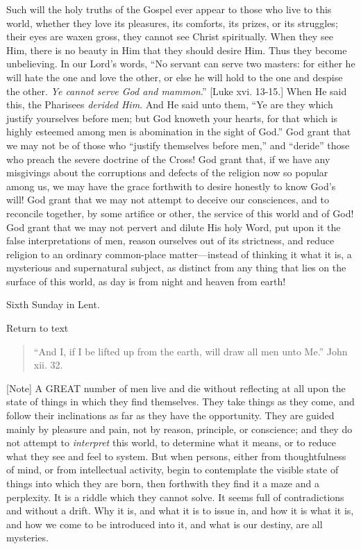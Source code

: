 Such will the holy truths of the Gospel ever appear to those who live
to this world, whether they love its pleasures, its comforts, its
prizes, or its struggles; their eyes are waxen gross, they cannot see
Christ spiritually. When they see Him, there is no beauty in Him that
they should desire Him. Thus they become unbelieving. In our Lord's
words, ``No servant can serve two masters: for either he will hate
the one and love the other, or else he will hold to the one and despise
the other. \emph{Ye cannot serve God and mammon}.'' [Luke xvi.
13-15.] When He said this, the Pharisees \emph{derided Him}. And He said
unto them, ``Ye are they which justify yourselves before men; but
God knoweth your hearts, for that which is highly esteemed among men is
abomination in the sight of God.'' God grant that we may not be of
those who ``justify themselves before men,'' and
``deride'' those who preach the severe doctrine of the Cross!
God grant that, if we have any misgivings about the corruptions and
defects of the religion now so popular among us, we may have the grace
forthwith to desire honestly to know God's will! God grant that we may
not attempt to deceive our consciences, and to reconcile together, by
some artifice or other, the service of this world and of God! God grant
that we may not pervert and dilute His holy Word, put upon it the false
interpretations of men, reason ourselves out of its strictness, and
reduce religion to an ordinary common-place matter—instead of thinking
it what it is, a mysterious and supernatural subject, as distinct from
any thing that lies on the surface of this world, as day is from night
and heaven from earth!


Sixth Sunday in Lent.

Return to text


\begin{quote}

``And I, if I be lifted up from the earth,
will draw all men unto Me.'' John xii. 32.

\end{quote}

[Note] A GREAT number of men live and die without reflecting
at all upon the state of things in which they find
themselves. They take things as they come, and follow
their inclinations as far as they have the opportunity.
They are guided mainly by pleasure and pain, not by
reason, principle, or conscience; and they do not attempt
to \emph{interpret} this world, to determine what it means, or
to reduce what they see and feel to system. But when
persons, either from thoughtfulness of mind, or from
intellectual activity, begin to contemplate the visible
state of things into which they are born, then forthwith
they find it a maze and a perplexity. It is a riddle
which they cannot solve. It seems full of contradictions
and without a drift. Why it is, and what it is to issue
in, and how it is what it is, and how we come to be
introduced into it, and what is our destiny, are all
mysteries.

